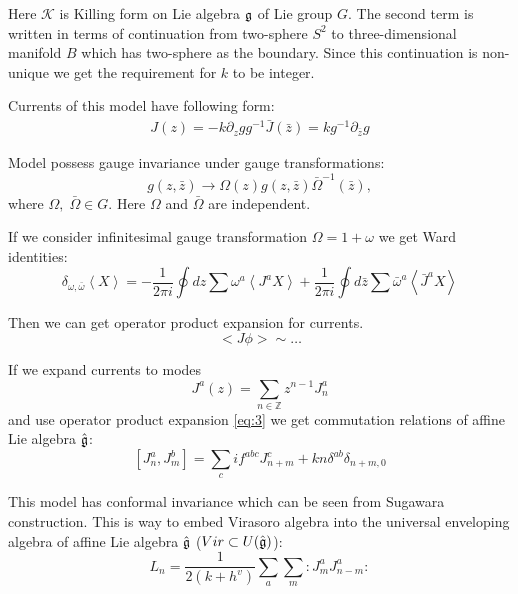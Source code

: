  Here $\mathcal{K}$ is Killing form on Lie algebra $\mathfrak{g}$ of Lie group $G$. The second term is written in terms of continuation from two-sphere $S^{2}$ to three-dimensional manifold $B$ which has two-sphere as the boundary. Since this continuation is non-unique we get the requirement for $k$ to be integer. 

Currents of this model have following form:
  \begin{eqnarray}
    J(z)= -k \partial_zg g^{-1}
    \bar J(\bar z)=k g^{-1}\partial_{\bar z}g
  \end{eqnarray}

Model possess gauge invariance under gauge transformations:
  \begin{equation*}
    g(z,\bar z)\to \Omega(z)g(z,\bar z)\bar \Omega^{-1}(\bar z),
  \end{equation*}
  where $\Omega,\;\bar \Omega \in G$.
Here $\Omega$ and $\bar \Omega$ are independent. 

If we consider infinitesimal gauge transformation $\Omega=1+\omega$ we get Ward identities:
  \begin{equation}
    \label{eq:87}
    \delta_{\omega,\bar \omega}\left< X \right>=-\frac{1}{2\pi i}\oint dz \sum\omega^a \left< J^a X\right>+
    \frac{1}{2\pi i} \oint d\bar z \sum \bar \omega^a \left< \bar J^a X\right>
  \end{equation}

 Then we can get operator product expansion for currents. 
 \begin{equation}
   \label{eq:3}
   <J\phi>\sim \dots
 \end{equation}

If we expand currents to modes
\begin{equation*}
  J^a(z)=\sum\limits_{n\in \mathbb Z}z^{n-1}J^a_n 
\end{equation*}
and use operator product expansion \eqref{eq:3} we get commutation relations of affine Lie algebra $\hat{\mathfrak{g}}$:
\begin{equation}
  \left[J^a_n,J^b_m\right]=\sum_c i f^{abc}J^c_{n+m}+kn\delta^{ab}\delta_{n+m,0} 
\end{equation}

This model has conformal invariance which can be seen from 
Sugawara construction. This is way to embed Virasoro algebra into the universal enveloping algebra of affine Lie algebra $\hat{\mathfrak{g}}$ ($Vir\subset U(\hat{\mathfrak{g}})$):
\begin{equation}
  \label{eq:4}
  L_n=\frac{1}{2(k+h^v)}\sum\limits_a\sum\limits_m:J^a_m J^a_{n-m}:
\end{equation}
  
